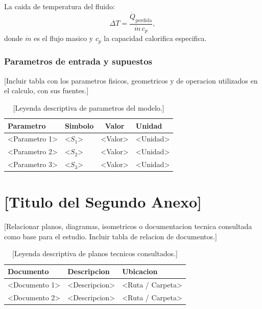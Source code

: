 La caida de temperatura del fluido:
\begin{equation}
    \Delta T = \frac{\dot{Q}_{\mathrm{perdida}}}{\dot{m} \, c_{p}},
    \label{eq:delta_t}
\end{equation}
donde $\dot{m}$ es el flujo masico y $c_{p}$ la capacidad calorifica especifica.

\subsubsection{Parametros de entrada y supuestos}

[Incluir tabla con los parametros fisicos, geometricos y de operacion
utilizados en el calculo, con sus fuentes.]

\begin{table}[htbp]
    \centering
    \caption{[Leyenda descriptiva de parametros del modelo.]}
    \label{tab:param_modelo}
    \begin{tabular}{@{}llcl@{}}
        \toprule
        \textbf{Parametro} & \textbf{Simbolo} & \textbf{Valor} & \textbf{Unidad} \\
        \midrule
        <Parametro 1> & <$S_1$> & <Valor> & <Unidad> \\
        <Parametro 2> & <$S_2$> & <Valor> & <Unidad> \\
        <Parametro 3> & <$S_3$> & <Valor> & <Unidad> \\
        \bottomrule
    \end{tabular}
\end{table}

\section{[Titulo del Segundo Anexo]}
\label{appendix:drawings}

[Relacionar planos, diagramas, isometricos o documentacion tecnica consultada
como base para el estudio. Incluir tabla de relacion de documentos.]

\begin{table}[htbp]
    \centering
    \caption{[Leyenda descriptiva de planos tecnicos consultados.]}
    \label{tab:planos}
    \begin{tabular}{@{}lll@{}}
        \toprule
        \textbf{Documento} & \textbf{Descripcion} & \textbf{Ubicacion} \\
        \midrule
        <Documento 1> & <Descripcion> & <Ruta / Carpeta> \\
        <Documento 2> & <Descripcion> & <Ruta / Carpeta> \\
        \bottomrule
    \end{tabular}
\end{table}

